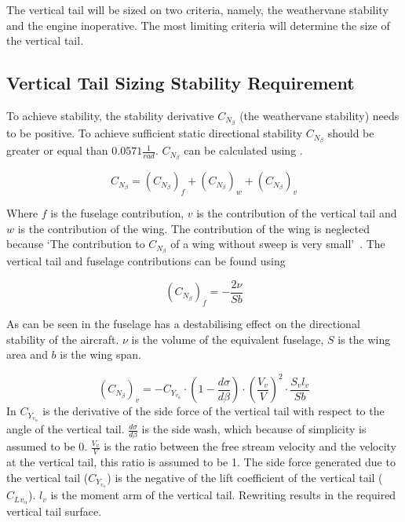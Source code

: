The vertical tail will be sized on two criteria, namely, the weathervane stability and the engine inoperative.
The most limiting criteria will determine the size of the vertical tail.

\subsection{Vertical Tail Sizing Stability Requirement}
\label{subsec:Vertical_Tail_Sizing_Stability_Requirement}

To achieve stability, the stability derivative $C_{N_{\beta}}$ (the weathervane stability) needs to be positive.
To achieve sufficient static directional stability $C_{N_{\beta}}$ should be greater or equal than $0.0571 \frac{1}{rad} $\cite{Roskam_Part_2}. $C_{N_{\beta}}$ can be calculated using .

\begin{equation}
    \label{eq:C_N_beta_total}
    C_{N_{\beta}} = \left(C_{N_{\beta}}\right)_{f} + \left(C_{N_{\beta}}\right)_{w} + \left(C_{N_{\beta}}\right)_{v}
\end{equation}

Where $f$ is the fuselage contribution, $v$ is the contribution of the vertical tail and $w$ is the contribution of the wing.
The contribution of the wing is neglected because \enquote*{The contribution to $C_{N_\beta}$ of a wing without sweep is very small}~\cite{FD_LectureNotes}.
The vertical tail and fuselage contributions can be found using 

\begin{equation}
    \label{eq:C_N_beta_fuselage}
    \left(C_{N_{\beta}}\right)_{f} = -\frac{2 \nu}{S b}
\end{equation}

As can be seen in  \cite{M&AE5070Notes} the fuselage has a destabilising effect on the directional stability of the aircraft.
$\nu$ is the volume of the equivalent fuselage, $S$ is the wing area and $b$ is the wing span.


\begin{equation}
    \label{eq:C_N_beta_tail}
    \left(C_{N_{\beta}}\right)_{v} = -C_{Y_{v_\alpha}} \cdot\left(1-\frac{d \sigma}{d \beta}\right) \cdot\left(\frac{V_v}{V}\right)^2 \cdot \frac{S_v l_v}{S b}
\end{equation}
In  \cite{FD_LectureNotes} $C_{Y_{v_\alpha}}$ is the derivative of the side force of the vertical tail with respect to the angle of the vertical tail. $\frac{d \sigma}{d \beta}$ is the side wash, which because of simplicity is assumed to be 0. $\frac{V_v}{V}$ is the ratio between the free stream velocity and the velocity at the vertical tail, this ratio is assumed to be 1.
The side force generated due to the vertical tail ($C_{Y_{v_\alpha}}$) is the negative of the lift coefficient of the vertical tail ($C_L{_{v_\alpha}}$). $l_{v}$ is the moment arm of the vertical tail.
Rewriting  results in the required vertical tail surface.

